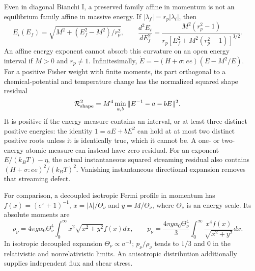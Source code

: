 Even in diagonal Bianchi I, a preserved family affine in momentum is not an equilibrium family affine in massive energy. If $|\lambda_f|=r_p|\lambda_i|$, then
\begin{equation}
 E_i(E_f)=\sqrt{M^2+(E_f^2-M^2)/r_p^2},\qquad
 \frac{d^2E_i}{dE_f^2}
 =\frac{M^2(r_p^2-1)}{r_p[E_f^2+M^2(r_p^2-1)]^{3/2}}.
 \label{ii:energy_family_curvature}
\end{equation}
An affine energy exponent cannot absorb this curvature on an open energy interval if $M>0$ and $r_p\ne1$. Infinitesimally, $\dot E=-(H+\sigma:ee)(E-M^2/E)$. For a positive Fisher weight with finite moments, its part orthogonal to a chemical-potential and temperature change has the normalized squared shape residual
\begin{equation}
 \mathcal R_{\rm shape}^2=M^4\min_{a,b}\|E^{-1}-a-bE\|^2.
 \label{ii:massive_shape_residual}
\end{equation}
It is positive if the energy measure contains an interval, or at least three distinct positive energies: the identity $1=aE+bE^2$ can hold at at most two distinct positive roots unless it is identically true, which it cannot be. A one- or two-energy atomic measure can instead have zero residual. For an exponent $E/(k_BT)-\eta$, the actual instantaneous squared streaming residual also contains $(H+\sigma:ee)^2/(k_BT)^2$. Vanishing instantaneous directional expansion removes that streaming defect.

For comparison, a decoupled isotropic Fermi profile in momentum has $f(x)=(e^x+1)^{-1}$, $x=|\lambda|/\Theta_\nu$ and $y=M/\Theta_\nu$, where $\Theta_\nu$ is an energy scale. Its absolute moments are
\begin{equation}
 \rho_\nu=4\pi g\alpha_0\Theta_\nu^4\int_0^\infty x^2\sqrt{x^2+y^2}f(x)dx,
 \qquad
 p_\nu=\frac{4\pi g\alpha_0\Theta_\nu^4}{3}
       \int_0^\infty\frac{x^4f(x)}{\sqrt{x^2+y^2}}dx.
 \label{ii:massive_fermi_moments}
\end{equation}
In isotropic decoupled expansion $\Theta_\nu\propto a^{-1}$; $p_\nu/\rho_\nu$ tends to $1/3$ and $0$ in the relativistic and nonrelativistic limits. An anisotropic distribution additionally supplies independent flux and shear stress.

